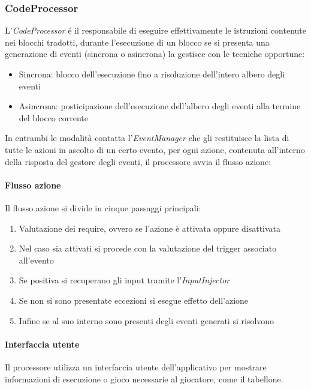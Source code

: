 \subsubsection{CodeProcessor}
L'\textit{CodeProcessor} é il responsabile di eseguire effettivamente le istruzioni contenute nei blocchi tradotti, durante l'esecuzione 
di un blocco se si presenta una generazione di eventi (sincrona o asincrona) la gestisce con le tecniche opportune:
\begin{itemize}
    \item Sincrona: blocco dell'esecuzione fino a risoluzione dell'intero albero degli eventi
    \item Asincrona: posticipazione dell'esecuzione dell'albero degli eventi alla termine del blocco corrente
\end{itemize}
In entrambi le modalità contatta l'\textit{EventManager} che gli restituisce la lista di tutte le azioni in ascolto di un certo evento,
per ogni azione, contenuta all'interno della risposta del gestore degli eventi, il processore avvia il flusso azione:
\paragraph{Flusso azione} Il flusso azione si divide in cinque passaggi principali:
\begin{enumerate}
    \item Valutazione dei require, ovvero se l'azione è attivata oppure disattivata
    \item Nel caso sia attivati si procede con la valutazione del trigger associato all'evento
    \item Se positiva si recuperano gli input tramite l'\textit{InputInjector}
    \item Se non si sono presentate eccezioni si esegue effetto dell'azione
    \item Infine se al suo interno sono presenti degli eventi generati si risolvono
\end{enumerate}

\paragraph{Interfaccia utente} Il processore utilizza un interfaccia utente dell'applicativo per mostrare informazioni
di esecuzione o gioco necessarie al giocatore, come il tabellone.